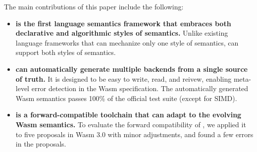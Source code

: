 The main contributions of this paper include the following:
\begin{itemize}
\item \textbf{\dslname is the first language semantics framework that
embraces both declarative and algorithmic styles of semantics.}
Unlike existing language frameworks that can mechanize only one style of semantics,
\dslname can support both styles of semantics.

\item \textbf{\dslname can automatically generate multiple backends from 
a single source of truth.}
It is designed to be easy to write, read, and reivew, enabling
meta-level error detection in the Wasm specification.
The automatically generated Wasm semantics passes
100\% of the official test suite (except for SIMD).

\item \textbf{\dslname is a forward-compatible toolchain that can
adapt to the evolving Wasm semantics.}
To evaluate the forward compatibility of \dslname, we applied it to five proposals
in Wasm 3.0 with minor adjustments, and found a few errors in the proposals.
\end{itemize}
